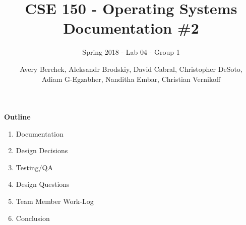 \documentclass[12pt]{article}
\title{CSE 150 - Operating Systems \\ Documentation \#2}
\subtitle{Spring 2018 - Lab 04 - Group 1}
\author{Avery Berchek, Aleksandr Brodskiy, David Cabral, Christopher DeSoto,\\Adiam G-Egzabher, Nanditha Embar, Christian Vernikoff}
\begin{document}
\maketitle
{\setlength{\parindent}{0cm}
\textbf{Outline}
\begin{enumerate}  
\item Documentation
\item Design Decisions
\item Testing/QA
\item Design Questions
\item Team Member Work-Log
\item Conclusion\\\\\\\\\\\\\\\\
\end{enumerate} 
}
\end{document}
